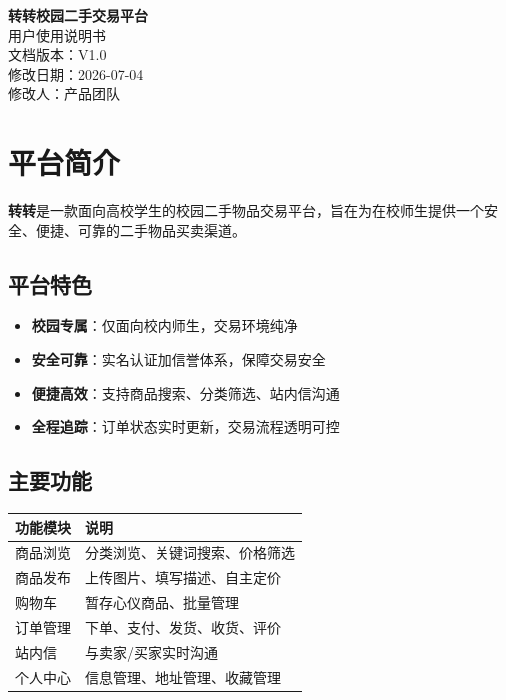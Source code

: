 \documentclass[12pt,a4paper,UTF8]{ctexart}
\begin{document}
\begin{titlepage}
\centering
\vspace*{4cm}
{\Huge\bfseries 转转校园二手交易平台\\[0.5cm]}
{\LARGE 用户使用说明书}\\[2cm]
{\large 文档版本：V1.0}\\
{\large 修改日期：2026-07-04}\\
{\large 修改人：产品团队}\\[5cm]
\vfill
\end{titlepage}

\tableofcontents
\newpage

\section{平台简介}

\textbf{转转}是一款面向高校学生的校园二手物品交易平台，旨在为在校师生提供一个安全、便捷、可靠的二手物品买卖渠道。

\subsection{平台特色}

\begin{itemize}
    \item \textbf{校园专属}：仅面向校内师生，交易环境纯净
    \item \textbf{安全可靠}：实名认证加信誉体系，保障交易安全
    \item \textbf{便捷高效}：支持商品搜索、分类筛选、站内信沟通
    \item \textbf{全程追踪}：订单状态实时更新，交易流程透明可控
\end{itemize}

\subsection{主要功能}

\begin{table}[H]
\centering
\begin{tabularx}{\textwidth}{lX}
\toprule
\textbf{功能模块} & \textbf{说明} \\
\midrule
商品浏览 & 分类浏览、关键词搜索、价格筛选 \\
商品发布 & 上传图片、填写描述、自主定价 \\
购物车 & 暂存心仪商品、批量管理 \\
订单管理 & 下单、支付、发货、收货、评价 \\
站内信 & 与卖家/买家实时沟通 \\
个人中心 & 信息管理、地址管理、收藏管理 \\
\bottomrule
\end{tabularx}
\end{table}
\end{document}
